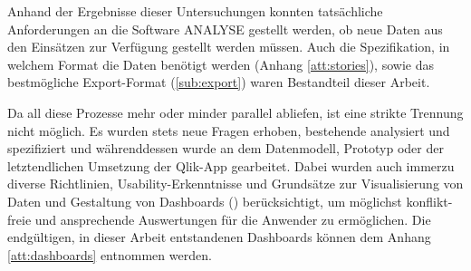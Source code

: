 Anhand der Ergebnisse dieser Untersuchungen konnten tatsächliche Anforderungen an die Software \gls{ANALYSE} gestellt werden, ob neue Daten aus den Einsätzen zur Verfügung gestellt werden müssen.
Auch die Spezifikation, in welchem Format die Daten benötigt werden (Anhang \ref{att:stories}), sowie das bestmögliche Export-Format (\ref{sub:export}) waren Bestandteil dieser Arbeit. 

Da all diese Prozesse mehr oder minder parallel abliefen, ist eine strikte Trennung nicht möglich.
Es wurden stets neue Fragen erhoben, bestehende analysiert und spezifiziert und währenddessen wurde an dem Datenmodell, Prototyp oder der letztendlichen Umsetzung der Qlik-App gearbeitet.
Dabei wurden auch immerzu diverse Richtlinien, Usability-Erkenntnisse und Grundsätze zur Visualisierung von Daten und Gestaltung von Dashboards (\cite{Bassler.2010, Card.2007, Fischer.2014, FischerStabel.2018, Hichert.2017, Kertzel.2018, Mccormick.1987, Schumann.2000, Ware.2009}) berücksichtigt, um möglichst konflikt-freie und ansprechende Auswertungen für die Anwender zu ermöglichen.
Die endgültigen, in dieser Arbeit entstandenen Dashboards können dem Anhang \ref{att:dashboards} entnommen werden.


